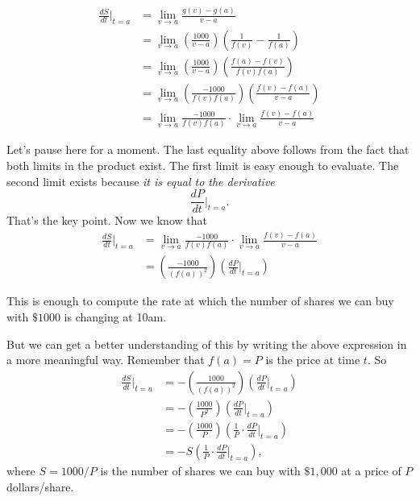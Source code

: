 \documentclass{ximera}
\begin{document}
\begin{question}
\begin{explanation}
\begin{itemize}
\begin{align*}
   \frac{dS}{dt}\Big|_{t=a}  &= \lim_{v\to a}\frac{g(v)-g(a)}{v-a}    \\
                                        &= \lim_{v\to a}  \left( \frac{1000}{v-a} \right) \left(   \frac{1}{f(v)} - \frac{1}{f(a)}  \right)  \\
                                 &= \lim_{v\to a}  \left( \frac{1000}{v-a} \right) \left(   \frac{f(a)-f(v)}{f(v)f(a)} \right)  \\
                                 &= \lim_{v\to a}  \left( \frac{-1000}{f(v)f(a)} \right) \left(   \frac{f(v)-f(a)}{v-a}  \right)  \\
                        &= \lim_{v\to a}  \frac{-1000}{f(v)f(a)} \cdot \lim_{v\to a}  \frac{f(v)-f(a)}{v-a}  
\end{align*}

Let's pause here for a moment. The last equality above follows from the fact that both limits in the product exist. The first limit is easy enough to evaluate. The second limit exists because \emph{it is equal to the derivative}
\[
      \frac{dP}{dt}\Big|_{t=a}.
\]
That's the key point. Now we know that
\begin{align*}
   \frac{dS}{dt}\Big|_{t=a}  &= \lim_{v\to a}  \frac{-1000}{f(v)f(a)} \cdot \lim_{v\to a}  \frac{f(v)-f(a)}{v-a} \\
                                       &= \left( \frac{-1000}{(f(a))^2} \right) \left( \frac{dP}{dt}\Big|_{t=a} \right)
\end{align*}

This is enough to compute the rate at which the number of shares we can buy with $\$1000$ is changing at 10am. 

But we can get a better understanding of this by writing the above expression in a more meaningful way. Remember that $f(a) = P$ is the price at time $t$. So 
\begin{align*}
   \frac{dS}{dt}\Big|_{t=a}  &= -\left( \frac{1000}{(f(a))^2} \right) \left( \frac{dP}{dt}\Big|_{t=a} \right) \\
                                         &= -\left( \frac{1000}{P^2} \right) \left( \frac{dP}{dt}\Big|_{t=a} \right) \\             
                                       &= -\left( \frac{1000}{P} \right) \left(\frac{1}{P}\cdot \frac{dP}{dt}\Big|_{t=a} \right) \\
                                         &= - S \left(\frac{1}{P}\cdot \frac{dP}{dt}\Big|_{t=a} \right) ,
\end{align*}
where $S=1000/P$ is the number of shares we can buy with $\$1,000$ at a price of $P$ dollars/share.


\end{itemize}
\end{explanation}
\end{question}
\end{document}
